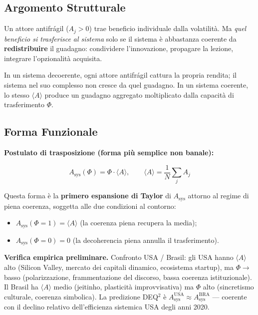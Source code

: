 \subsection{Argomento Strutturale}\label{argomento-estructural}

Un attore antifrágil (\(A_j > 0\)) trae beneficio individuale dalla
volatilità. Ma \emph{quel beneficio si trasferisce al sistema} solo se
il sistema è abbastanza coerente da \textbf{redistribuire} il guadagno:
condividere l'innovazione, propagare la lezione, integrare l'opzionalità
acquisita.

In un sistema decoerente, ogni attore antifrágil cattura la propria
rendita; il sistema nel suo complesso non cresce da quel guadagno. In un
sistema coerente, lo stesso \(\langle A \rangle\) produce un guadagno
aggregato moltiplicato dalla capacità di trasferimento \(\Phi\).

\subsection{Forma Funzionale}\label{forma-funzionale}

\Hypoth{} \textbf{Postulato di trasposizione (forma più semplice non
banale):}

\[
A_{\text{sys}}(\Phi) = \Phi \cdot \langle A \rangle, \qquad \langle A \rangle = \frac{1}{N}\sum_j A_j
\]

Questa forma è la \textbf{primero espansione di Taylor} di
\(A_{\text{sys}}\) attorno al regime di piena coerenza, soggetta alle
due condizioni al contorno:

\begin{itemize}
\tightlist
\item
  \(A_{\text{sys}}(\Phi = 1) = \langle A \rangle\) (la coerenza piena
  recupera la media);
\item
  \(A_{\text{sys}}(\Phi = 0) = 0\) (la decoherencia piena annulla il
  trasferimento).
\end{itemize}

\Proved{} \textbf{Verifica empirica preliminare.} Confronto USA /
Brasil: gli USA hanno \(\langle A \rangle\) alto (Silicon Valley,
mercato dei capitali dinamico, ecosistema startup), ma \(\Phi \to\)
basso (polarizzazione, frammentazione del discorso, bassa coerenza
istituzionale). Il Brasil ha \(\langle A \rangle\) medio (jeitinho,
plasticità improvvisativa) ma \(\Phi\) alto (sincretismo culturale,
coerenza simbolica). La predizione DEQ$^2$ è
\(A_{\text{sys}}^{\text{USA}} \approx A_{\text{sys}}^{\text{BRA}}\) ---
coerente con il declino relativo dell'efficienza sistemica USA degli
anni 2020.

